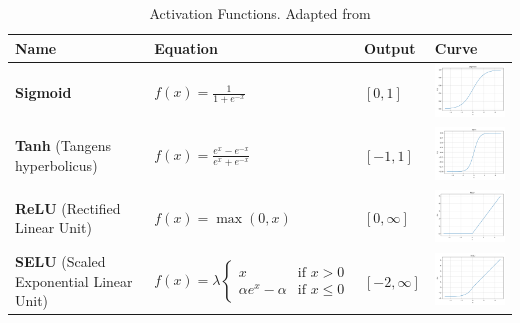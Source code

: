 \begin{table}[ht]
\centering
\renewcommand{\arraystretch}{1.5} %
\begin{tabular}{|
  >{\centering\arraybackslash}m{3cm} |
  >{\centering\arraybackslash}m{5cm} |
  >{\centering\arraybackslash}m{1.33cm} |
  >{\centering\arraybackslash}m{4cm} |}
\hline
\textbf{Name} & \textbf{Equation} & \textbf{Output} & \textbf{Curve}\\
\hline
\textbf{Sigmoid} & $f(x) = \frac{1}{1 + e^{-x}}$ & $[0, 1]$ & \includegraphics[width=4cm]{images/sigmoid.png}\\
\hline
\textbf{Tanh} (Tangens hyperbolicus) & $f(x) = \frac{e^x - e^{-x}}{e^x + e^{-x}}$ & $[-1, 1]$ & \includegraphics[width=4cm]{images/tanh.png}\\
\hline
\textbf{ReLU} (Rectified Linear Unit) & $f(x) = \max(0, x)$ & $[0, \infty]$ & \includegraphics[width=4cm]{images/relu.png}\\
\hline
\textbf{SELU} (Scaled Exponential Linear Unit) & 
$f(x) = \lambda\begin{cases} 
x & \text{if } x > 0 \\
\alpha e^x - \alpha & \text{if } x \leq 0 
\end{cases}$ & $[-2, \infty]$ & \includegraphics[width=4cm]{images/selu.png}\\
\hline
\end{tabular}
\caption{Activation Functions. Adapted from \cite{Berahmand24}}
\label{tab:activations_functions}
\end{table}

